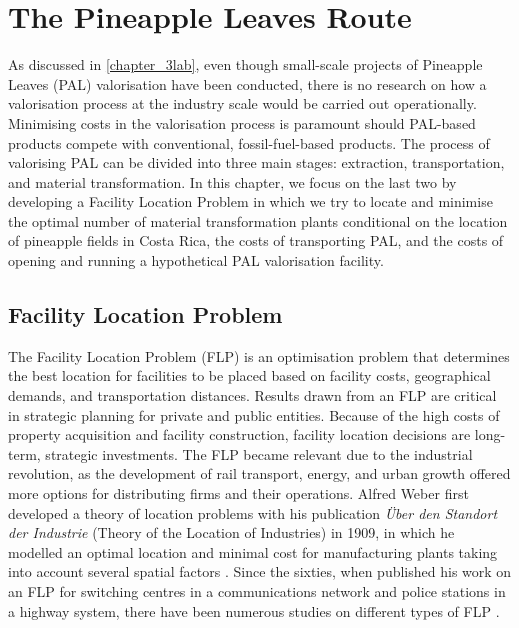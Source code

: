 \chapter{The Pineapple Leaves Route}
\label{FLPchapt4}

As discussed in \cref{chapter_3lab}, even though small-scale projects of Pineapple Leaves (PAL) valorisation have been conducted, there is no research on how a valorisation process at the industry scale would be carried out operationally. Minimising costs in the valorisation process is paramount should PAL-based products compete with conventional, fossil-fuel-based products. The process of valorising PAL can be divided into three main stages: extraction, transportation, and material transformation. In this chapter, we focus on the last two by developing a Facility Location Problem in which we try to locate and minimise the optimal number of material transformation plants conditional on the location of pineapple fields in Costa Rica, the costs of transporting PAL, and the costs of opening and running a hypothetical PAL valorisation facility. 

\section{Facility Location Problem}

The Facility Location Problem (FLP) is an optimisation problem that determines the best location for facilities to be placed based on facility costs, geographical demands, and transportation distances. Results drawn from an FLP are critical in strategic planning for private and public entities. Because of the high costs of property acquisition and facility construction, facility location decisions are long-term, strategic investments. The FLP became relevant due to the industrial revolution, as the development of rail transport, energy, and urban growth offered more options for distributing firms and their operations. Alfred Weber first developed a theory of location problems with his publication \textit{Über den Standort der Industrie} (Theory of the Location of Industries) in 1909, in which he modelled an optimal location and minimal cost for manufacturing plants taking into account several spatial factors \citep{fearon2006alfred}. Since the sixties, when \citeauthor{hakimi1964optimum} published his work on an FLP for switching centres in a communications network and police stations in a highway system, there have been numerous studies on different types of FLP \citep{farahani2009facility}.

